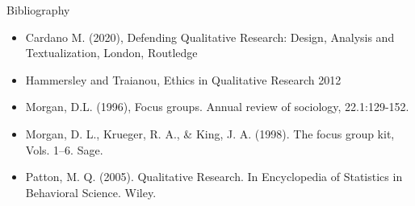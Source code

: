 \documentclass[10pt, aspectratio=169]{beamer}
\begin{document}
\begin{frame}{Bibliography}

\begin{itemize}
    \item Cardano M. (2020), Defending Qualitative Research: Design, Analysis and Textualization, London, Routledge
    \item Hammersley and Traianou, Ethics in Qualitative Research 2012
    \item Morgan, D.L. (1996), Focus groups. Annual review of sociology, 22.1:129-152.
    \item Morgan, D. L., Krueger, R. A., \& King, J. A. (1998). The focus group kit, Vols. 1–6. Sage.
    \item Patton, M. Q. (2005). Qualitative Research. In Encyclopedia of Statistics in Behavioral Science. Wiley. 
\end{itemize}
\end{frame}
\end{document}
